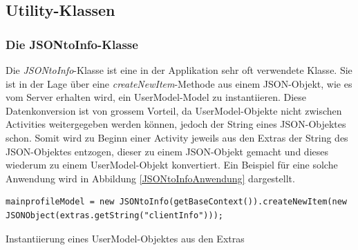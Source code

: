 \documentclass[../main.tex]{subfiles}
\begin{document}
	
	\subsection{Utility-Klassen}
	\subsubsection{Die JSONtoInfo-Klasse}
	Die \emph{JSONtoInfo}-Klasse ist eine in der Applikation sehr oft verwendete Klasse. Sie ist in der Lage über eine \emph{createNewItem}-Methode aus einem JSON-Objekt, wie es vom Server erhalten wird, ein UserModel-Model zu instantiieren. Diese Datenkonversion ist von grossem Vorteil, da UserModel-Objekte nicht zwischen Activities weitergegeben werden können, jedoch der String eines JSON-Objektes schon. Somit wird zu Beginn einer Activity jeweils aus den Extras der String des JSON-Objektes entzogen, dieser zu einem JSON-Objekt gemacht und dieses wiederum zu einem UserModel-Objekt konvertiert. Ein Beispiel für eine solche Anwendung wird in Abbildung \ref{JSONtoInfoAnwendung} dargestellt.
	
\begin{code}
	\begin{center}
		\begin{verbatim}
mainprofileModel = new JSONtoInfo(getBaseContext()).createNewItem(new JSONObject(extras.getString("clientInfo")));			
		\end{verbatim}
		\caption{Instantiierung eines UserModel-Objektes aus den Extras}
		\label{JSONtoInfoAnwendung}
	\end{center}
\end{code}
	
\end{document}
